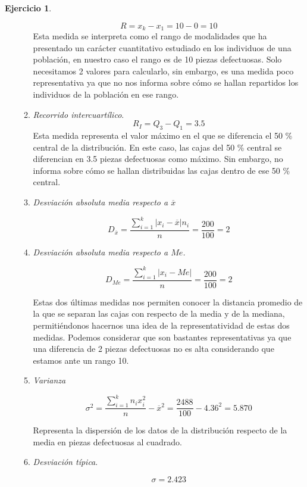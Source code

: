 \documentclass[a4paper, 12pt]{article}
\providecommand{\abs}[1]{\lvert#1\rvert}
\theoremstyle{definition}
\newtheorem{ej}{Ejercicio}
\begin{document}
\begin{ej}
\begin{enumerate}[label=\textit{\alph*)}]
\begin{enumerate}[label=\arabic*)]
        \[
        R = x_k - x_1 = 10 - 0 = 10
        \]
        Esta medida se interpreta como el rango de modalidades que ha presentado un carácter cuantitativo estudiado en los individuos de una población, en nuestro caso el rango es de 10 piezas defectuosas. Solo necesitamos 2 valores para calcularlo, sin embargo, es una medida poco representativa ya que no nos informa sobre cómo se hallan repartidos los individuos de la población en ese rango.
        \item \textit{Recorrido intercuartílico}.
        \[
        R_I = Q_3 - Q_1 = 3.5
        \]
        Esta medida representa el valor máximo en el que se diferencia el 50 \% central de la distribución. En este caso, las cajas del 50 \% central se diferencian en 3.5 piezas defectuosas como máximo. Sin embargo, no informa sobre cómo se hallan distribuidas las cajas dentro de ese 50 \% central.
        \item \textit{Desviación absoluta media respecto a \(\overline{x}\)}
        
        \[
        D_{\overline{x}} = \frac{\sum_{i=1}^{k}\abs{x_i-\overline{x}}n_i}{n} = \frac{200}{100} = 2
        \]
        
        \item \textit{Desviación absoluta media respecto a \(Me\).}
        
        \[
        D_{Me} = \frac{\sum_{i=1}^{k}\abs{x_i-Me}}{n} = \frac{200}{100} = 2
        \]
        
        Estas dos últimas medidas nos permiten conocer la distancia promedio de la que se separan las cajas con respecto de la media y de la mediana, permitiéndonos hacernos una idea de la representatividad de estas dos medidas. Podemos considerar que son bastantes representativas ya que una diferencia de 2 piezas defectuosas no es alta considerando que estamos ante un rango 10.
        
        \item \textit{Varianza}
        
        \[
        \sigma^2 = \frac{\sum_{i=1}^{k}n_ix_i^2}{n} - \overline{x}^2 = \frac{2488}{100} - 4.36^2 = 5.870
        \]
        
        Representa la dispersión de los datos de la distribución respecto de la media en piezas defectuosas al cuadrado.
        
        \item \textit{Desviación típica}.
        
        \[
        \sigma = 2.423
        \]
        

\end{enumerate}
\end{enumerate}
\end{ej}
\end{document}
